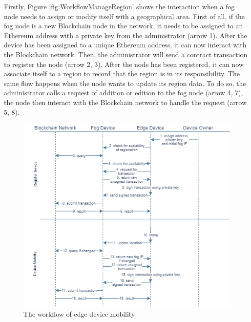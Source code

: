 \npara Firstly, Figure \ref{fig:WorkflowManageRegion} shows the interaction when a fog node needs to assign or modify itself with a geographical area.
First of all, if the fog node is a new Blockchain node in the network, it needs to be assigned to an Ethereum address with a private key from the administrator (arrow 1).
After the device has been assigned to a unique Ethereum address, it can now interact with the Blockchain network.
Then, the administrator will send a contract transaction to register the node (arrow 2, 3).
After the node has been registered, it can now associate itself to a region to record that the region is in its responsibility.
The same flow happens when the node wants to update its region data.
To do so, the administrator calls a request of addition or edition to the fog node (arrow 4, 7), the node then interact with the Blockchain network to handle the request (arrow 5, 8).

\begin{figure}[htb!]
  \centering
  \includegraphics[width=\textwidth]{images/WorkflowMobility.png}
  \caption{The workflow of edge device mobility}
  \label{fig:WorkflowMobility}
\end{figure}

